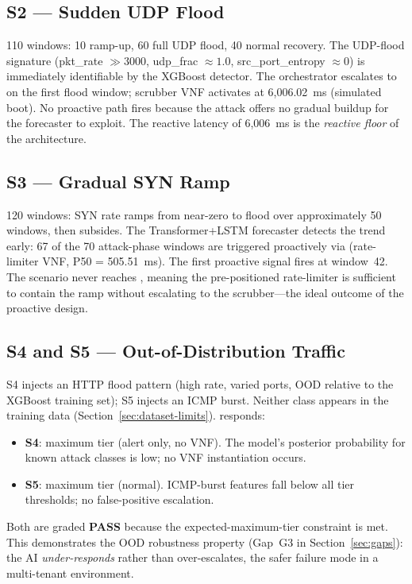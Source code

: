 \subsection{S2 --- Sudden UDP Flood}
110 windows: 10 ramp-up, 60 full UDP flood, 40 normal recovery.
The UDP-flood signature (pkt\_rate $\gg 3000$, udp\_frac $\approx 1.0$,
src\_port\_entropy $\approx 0$) is immediately identifiable by the
XGBoost detector. The orchestrator escalates to  on the first
flood window; scrubber VNF activates at 6{,}006.02~ms (simulated boot).
No proactive path fires because the attack offers no gradual buildup for
the forecaster to exploit. The  reactive latency of 6{,}006~ms
is the \emph{reactive floor} of the \padonap{} architecture.

\subsection{S3 --- Gradual SYN Ramp}
120 windows: SYN rate ramps from near-zero to flood over approximately
50 windows, then subsides. The Transformer+LSTM forecaster detects the
trend early: 67 of the 70 attack-phase windows are triggered proactively
via  (rate-limiter VNF, P50 = 505.51~ms). The first proactive
signal fires at window~42. The scenario never reaches , meaning
the pre-positioned rate-limiter is sufficient to contain the ramp without
escalating to the scrubber---the ideal outcome of the proactive design.

\subsection{S4 and S5 --- Out-of-Distribution Traffic}
S4 injects an HTTP flood pattern (high rate, varied ports, OOD relative
to the XGBoost training set); S5 injects an ICMP burst. Neither class
appears in the training data (Section~\ref{sec:dataset-limits}).
\padonap{} responds:

\begin{itemize}
  \item \textbf{S4}: maximum tier  (alert only, no VNF). The
        model's posterior probability for known attack classes is low;
        no VNF instantiation occurs.
  \item \textbf{S5}: maximum tier  (normal). ICMP-burst features
        fall below all tier thresholds; no false-positive escalation.
\end{itemize}

Both are graded \textbf{PASS} because the expected-maximum-tier
constraint is met. This demonstrates the OOD robustness property
(Gap~G3 in Section~\ref{sec:gaps}): the AI \emph{under-responds}
rather than over-escalates, the safer failure mode in a multi-tenant
environment.

